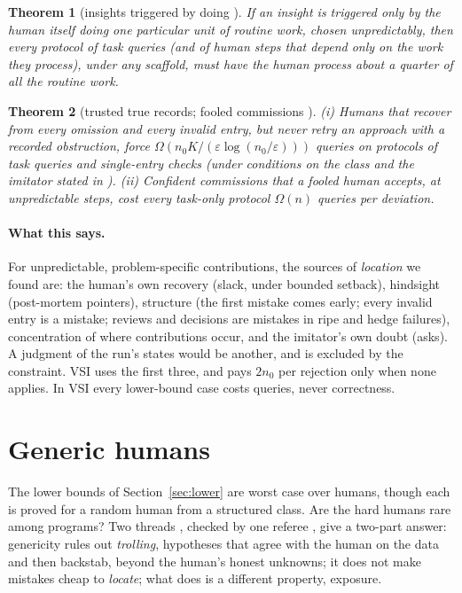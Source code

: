 \documentclass[11pt]{article}
\newtheorem{theorem}{Theorem}[section]
\theoremstyle{definition}
\theoremstyle{remark}
\newcommand{\K}{K}
\begin{document}
\begin{theorem}[insights triggered by doing \cite{threadG}]\label{thm:doing}
If an insight is triggered only by the human itself \emph{doing} one particular unit of routine work, chosen unpredictably, then every protocol of task queries (and of human steps that depend only on the work they process), under any scaffold, must have the human process about a quarter of all the routine work.
\end{theorem}

\begin{theorem}[trusted true records; fooled commissions \cite{threadF,threadJ}]\label{thm:records}
(i) Humans that recover from every omission and every invalid entry, but never retry an approach with a recorded obstruction, force $\Omega(n_0\K/(\varepsilon\log(n_0/\varepsilon)))$ queries on protocols of task queries and single-entry checks (under conditions on the class and the imitator stated in \cite{threadF}). (ii) Confident commissions that a fooled human accepts, at unpredictable steps, cost every task-only protocol $\Omega(n)$ queries per deviation.
\end{theorem}

\paragraph{What this says.} For unpredictable, problem-specific contributions, the sources of \emph{location} we found are: the human's own recovery (slack, under bounded setback), hindsight (post-mortem pointers), structure (the first mistake comes early; every invalid entry is a mistake; reviews and decisions are mistakes in ripe and hedge failures), concentration of where contributions occur, and the imitator's own doubt (asks). A judgment of the run's states would be another, and is excluded by the constraint. VSI uses the first three, and pays $2n_0$ per rejection only when none applies. In VSI every lower-bound case costs queries, never correctness.

\section{Generic humans}\label{sec:generic}

The lower bounds of Section~\ref{sec:lower} are worst case over humans, though each is proved for a random human from a structured class. Are the hard humans rare among programs? Two threads \cite{threadGA,threadGB}, checked by one referee \cite{referee11}, give a two-part answer: genericity rules out \emph{trolling}, hypotheses that agree with the human on the data and then backstab, beyond the human's honest unknowns; it does not make mistakes cheap to \emph{locate}; what does is a different property, exposure.
\end{document}
